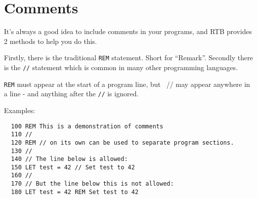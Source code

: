 \chapter{Comments}

It's always a good idea to include comments in your programs, and RTB
provides 2 methods to help you do this.

Firstly, there is the traditional {\tt REM} statement. Short for
``Remark''.  Secondly there is the {\tt //} statement which is
common in many other programming languages.

{\tt REM} must appear at the start of a program line, but {\ //} may
appear anywhere in a line - and anything after the {\tt //} is ignored.

Examples:
\begin{verbatim}
  100 REM This is a demonstration of comments
  110 //
  120 REM // on its own can be used to separate program sections.
  130 //
  140 // The line below is allowed:
  150 LET test = 42 // Set test to 42
  160 //
  170 // But the line below this is not allowed:
  180 LET test = 42 REM Set test to 42
\end{verbatim}

